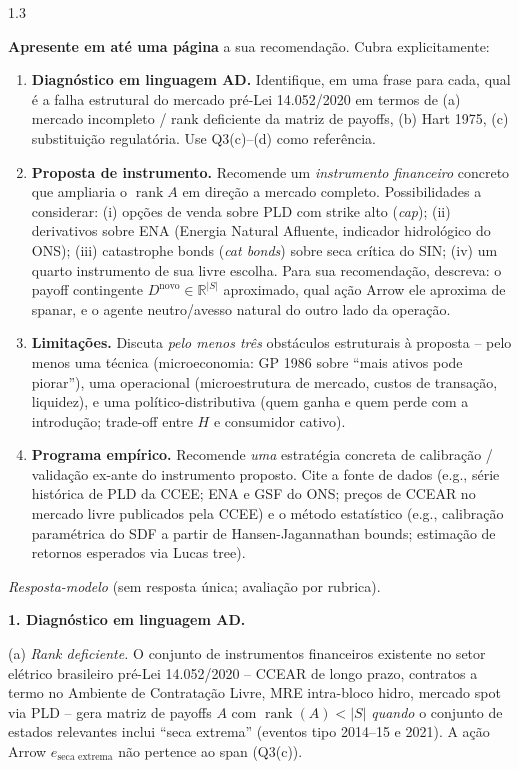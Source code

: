 \documentclass[11pt,addpoints]{exam}
\newcommand{\rank}{\operatorname{rank}}
\begin{document}
\begin{spacing}{1.3}
\begin{questions}
\textbf{Apresente em até uma página} a sua recomendação. Cubra explicitamente:

\begin{enumerate}[noitemsep,topsep=2pt]
\item \textbf{Diagnóstico em linguagem AD.} Identifique, em uma frase para cada, qual é a falha estrutural do mercado pré-Lei 14.052/2020 em termos de (a) mercado incompleto / rank deficiente da matriz de payoffs, (b) Hart 1975, (c) substituição regulatória. Use Q3(c)--(d) como referência.

\item \textbf{Proposta de instrumento.} Recomende um \emph{instrumento financeiro} concreto que ampliaria o $\rank A$ em direção a mercado completo. Possibilidades a considerar: (i) opções de venda sobre PLD com strike alto (\emph{cap}); (ii) derivativos sobre ENA (Energia Natural Afluente, indicador hidrológico do ONS); (iii) catastrophe bonds (\emph{cat bonds}) sobre seca crítica do SIN; (iv) um quarto instrumento de sua livre escolha. Para sua recomendação, descreva: o payoff contingente $D^{\text{novo}} \in \mathbb{R}^{|S|}$ aproximado, qual ação Arrow ele aproxima de spanar, e o agente neutro/avesso natural do outro lado da operação.

\item \textbf{Limitações.} Discuta \emph{pelo menos três} obstáculos estruturais à proposta -- pelo menos uma técnica (microeconomia: GP 1986 sobre ``mais ativos pode piorar''), uma operacional (microestrutura de mercado, custos de transação, liquidez), e uma político-distributiva (quem ganha e quem perde com a introdução; trade-off entre $H$ e consumidor cativo).

\item \textbf{Programa empírico.} Recomende \emph{uma} estratégia concreta de calibração / validação ex-ante do instrumento proposto. Cite a fonte de dados (e.g., série histórica de PLD da CCEE; ENA e GSF do ONS; preços de CCEAR no mercado livre publicados pela CCEE) e o método estatístico (e.g., calibração paramétrica do SDF a partir de Hansen-Jagannathan bounds; estimação de retornos esperados via Lucas tree).
\end{enumerate}

\begin{solution}
\textit{Resposta-modelo} (sem resposta única; avaliação por rubrica).

\textbf{1. Diagnóstico em linguagem AD.}

(a) \emph{Rank deficiente.} O conjunto de instrumentos financeiros existente no setor elétrico brasileiro pré-Lei 14.052/2020 -- CCEAR de longo prazo, contratos a termo no Ambiente de Contratação Livre, MRE intra-bloco hidro, mercado spot via PLD -- gera matriz de payoffs $A$ com $\rank(A) < |S|$ \emph{quando} o conjunto de estados relevantes inclui ``seca extrema'' (eventos tipo 2014--15 e 2021). A ação Arrow $e_{\text{seca extrema}}$ não pertence ao span (Q3(c)).


\end{solution}
\end{questions}
\end{spacing}
\end{document}
